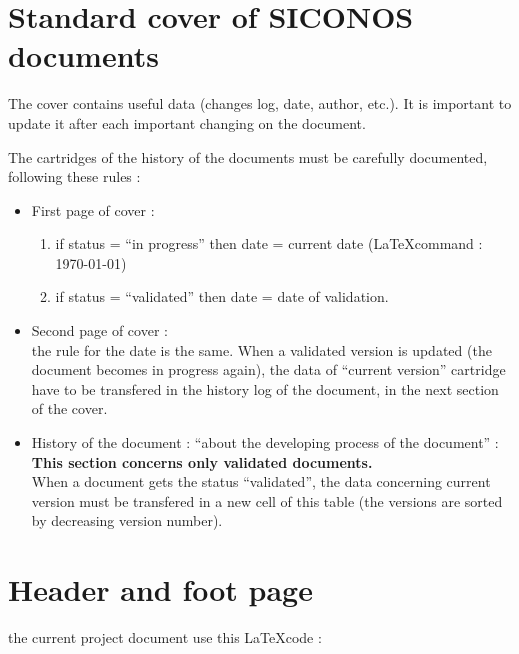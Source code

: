 \documentclass[a4paper,twoside,openright,makeidx,12pt]{report}
\begin{document}
\section{Standard cover of SICONOS documents}

The cover contains useful data (changes log, date, author, etc.). It is important to update it after each important changing on the document.

The cartridges of the history of the documents must be carefully documented, following these rules :
\begin{itemize}
\item First page of cover : 
  \begin{enumerate}
  \item if status = ``in progress'' then date = current date (\LaTeX  command : \\\today)
  \item if status = ``validated'' then date = date of validation. 
  \end{enumerate}
\item Second page of cover : \\
  the rule for the date is the same. When a validated version is updated (the document becomes in progress again), the data of ``current version'' cartridge have to be transfered in the history log of the document, in the next section of the cover.
\item History of the document : ``about the developing process of the document'' : \\
  \textbf{This section concerns only validated documents.}\\ When a document gets the status ``validated'', the data concerning current version must be transfered in a new cell of this table (the versions are sorted by decreasing version number).
  
\end{itemize}

\clearpage

\clearpage

\section{Header and foot page}

the current project document use this \LaTeX code : \\
\end{document}
